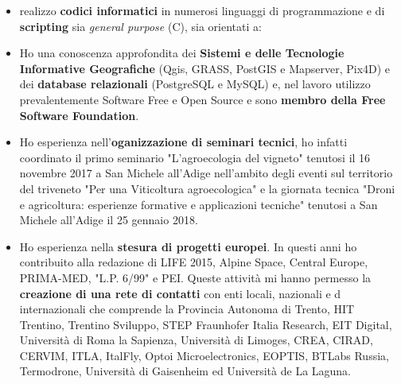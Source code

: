 \documentclass{curriculum}
\begin{document}
        \begin{itemize}[label=\textendash]
            \item realizzo \textbf{codici informatici} in numerosi linguaggi di programmazione e di \textbf{scripting} sia \textit{general purpose} (C), sia orientati a:
            \item Ho una conoscenza approfondita dei \textbf{Sistemi e delle Tecnologie Informative Geografiche} (Qgis, GRASS, PostGIS e Mapserver, Pix4D) e dei \textbf{database relazionali} (PostgreSQL e MySQL) e, nel lavoro utilizzo prevalentemente Software Free e Open Source e sono \textbf{membro della Free Software Foundation}.
            \item Ho esperienza nell'\textbf{oganizzazione di seminari tecnici}, ho infatti coordinato il primo seminario "L'a\-gro\-e\-co\-lo\-gi\-a del vigneto" tenutosi il 16 novembre 2017 a San Michele all'Adige nell'ambito degli eventi sul territorio del triveneto "Per una Viticoltura agroecologica" e la giornata tecnica "Droni e agricoltura: esperienze formative e applicazioni tecniche" tenutosi a San Michele all'Adige il 25 gennaio 2018.
            \item Ho esperienza nella \textbf{stesura di progetti europei}. In questi anni ho contribuito alla redazione di LIFE 2015, Alpine Space, Central Europe, PRIMA-MED, "L.P. 6/99" e PEI. Queste attività mi hanno permesso la \textbf{creazione di una rete di contatti} con enti locali, nazionali e d internazionali che comprende la Provincia Autonoma di Trento, HIT Trentino, Trentino Sviluppo, STEP Fraunhofer Italia Research, EIT Digital, Università di Roma la Sapienza, Università di Limoges, CREA, CIRAD, CERVIM, ITLA, ItalFly, Optoi Microelectronics, EOPTIS, BTLabs Russia, Termodrone, Università di Gaisenheim ed Università de La Laguna.

\end{itemize}
\end{document}
